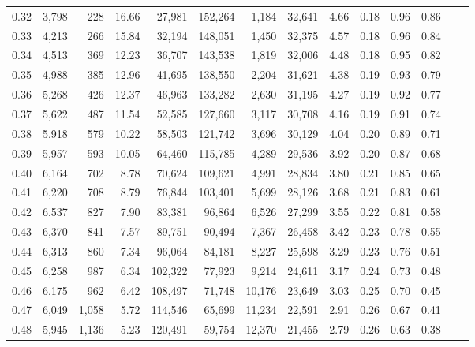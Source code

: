 \begin{tabular}{rrrrrrrrrrrrrr}
0.32 &  3,798 &    228 &   16.66 &   27,981 &  152,264 &   1,184 &  32,641 &  4.66 &  0.18 &  0.96 &      0.86 \\
0.33 &  4,213 &    266 &   15.84 &   32,194 &  148,051 &   1,450 &  32,375 &  4.57 &  0.18 &  0.96 &      0.84 \\
0.34 &  4,513 &    369 &   12.23 &   36,707 &  143,538 &   1,819 &  32,006 &  4.48 &  0.18 &  0.95 &      0.82 \\
0.35 &  4,988 &    385 &   12.96 &   41,695 &  138,550 &   2,204 &  31,621 &  4.38 &  0.19 &  0.93 &      0.79 \\
0.36 &  5,268 &    426 &   12.37 &   46,963 &  133,282 &   2,630 &  31,195 &  4.27 &  0.19 &  0.92 &      0.77 \\
0.37 &  5,622 &    487 &   11.54 &   52,585 &  127,660 &   3,117 &  30,708 &  4.16 &  0.19 &  0.91 &      0.74 \\
0.38 &  5,918 &    579 &   10.22 &   58,503 &  121,742 &   3,696 &  30,129 &  4.04 &  0.20 &  0.89 &      0.71 \\
0.39 &  5,957 &    593 &   10.05 &   64,460 &  115,785 &   4,289 &  29,536 &  3.92 &  0.20 &  0.87 &      0.68 \\
0.40 &  6,164 &    702 &    8.78 &   70,624 &  109,621 &   4,991 &  28,834 &  3.80 &  0.21 &  0.85 &      0.65 \\
0.41 &  6,220 &    708 &    8.79 &   76,844 &  103,401 &   5,699 &  28,126 &  3.68 &  0.21 &  0.83 &      0.61 \\
0.42 &  6,537 &    827 &    7.90 &   83,381 &   96,864 &   6,526 &  27,299 &  3.55 &  0.22 &  0.81 &      0.58 \\
0.43 &  6,370 &    841 &    7.57 &   89,751 &   90,494 &   7,367 &  26,458 &  3.42 &  0.23 &  0.78 &      0.55 \\
0.44 &  6,313 &    860 &    7.34 &   96,064 &   84,181 &   8,227 &  25,598 &  3.29 &  0.23 &  0.76 &      0.51 \\
0.45 &  6,258 &    987 &    6.34 &  102,322 &   77,923 &   9,214 &  24,611 &  3.17 &  0.24 &  0.73 &      0.48 \\
0.46 &  6,175 &    962 &    6.42 &  108,497 &   71,748 &  10,176 &  23,649 &  3.03 &  0.25 &  0.70 &      0.45 \\
0.47 &  6,049 &  1,058 &    5.72 &  114,546 &   65,699 &  11,234 &  22,591 &  2.91 &  0.26 &  0.67 &      0.41 \\
0.48 &  5,945 &  1,136 &    5.23 &  120,491 &   59,754 &  12,370 &  21,455 &  2.79 &  0.26 &  0.63 &      0.38 \\

\end{tabular}
